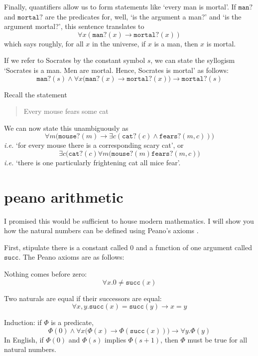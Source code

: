 \documentclass{scrbook}
\renewcommand{\implies}{\to}
\begin{document}
Finally, quantifiers allow us to form statements like `every man is mortal'. If $\texttt{man?}$ and $\texttt{mortal?}$ are the predicates for, well, `is the argument a man?' and `is the argument mortal?', this sentence translates to
\[
\forall x ( \texttt{man?}(x) \implies \texttt{mortal?}(x) )
\]
which says roughly, for all $x$ in the universe, if $x$ is a man, then $x$ is mortal. 

If we refer to Socrates by the constant symbol $s$, we can state the syllogism `Socrates is a man. Men are mortal. Hence, Socrates is mortal' as follows:
\[
\texttt{man?}(s) \wedge \forall x \bigl(\texttt{man?}(x)\implies\texttt{mortal?}(x)\bigr) \implies \texttt{mortal?}(s)
\]

Recall the statement
\begin{quote}
  Every mouse fears some cat
\end{quote}
We can now state this unambiguously as 
\[
\forall m \bigr(\texttt{mouse?}(m) \implies \exists c (\texttt{cat?}(c)\wedge \texttt{fears?}(m,c)) \bigl)
\]
\emph{i.e.} `for every mouse there is a corresponding scary cat', or 
\[
\exists c \bigl(\texttt{cat?}(c) \forall m (\texttt{mouse?}(m) \texttt{fears?}(m,c)\bigr)
\]
\emph{i.e.} `there is one particularly frightening cat all mice fear'.

\section[Peano Arithmetic]{peano arithmetic}
I promised this would be sufficient to house modern mathematics. I will show you how the natural numbers can be defined using Peano's axioms \cite{wiki:peano}. 

\renewcommand{\succ}{\texttt{succ}}
First, stipulate there is a constant called $0$ and a function of one argument called $\succ$. 
The Peano axioms are as follows: 
\begin{trivlist}
\item Nothing comes before zero:
  \[
  \forall x. 0 \neq \succ(x)
  \]
\item Two naturals are equal if their successors are equal:
  \[
  \forall x,y. \succ (x) = \succ(y) \implies x=y
  \]
\item Induction: if $\Phi$ is a predicate, 
  \[
  \Phi(0) \wedge \forall x \bigl(\Phi(x)\implies \Phi(\succ(x))\bigr) \implies \forall y.\Phi(y)
  \]
  In English, if $\Phi(0)$ and $\Phi(s)$ implies $\Phi(s+1)$, then $\Phi$ must be true for all natural numbers. 
\end{trivlist}
\end{document}
